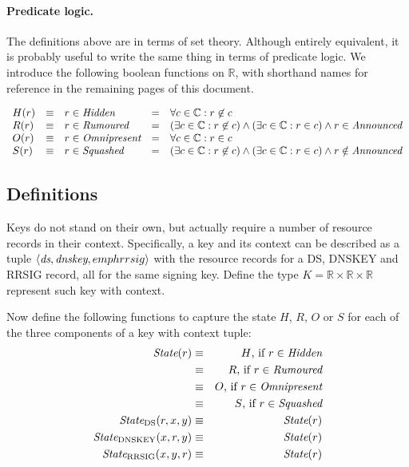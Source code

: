 \documentclass[twoside,english]{paper}
\begin{document}
\paragraph{Predicate logic.}
The definitions above are in terms of set theory.  Although entirely equivalent, it is
probably useful to write the same thing in terms of predicate logic.  We introduce the
following boolean functions on $\mathbb{R}$, with shorthand names for reference in the
remaining pages of this document.

\begin{displaymath}
\begin{array}{lllll}
       H(r) & \equiv & r\in\emph{Hidden} &=& \forall c \in \mathbb{C}: r \not \in c \\
       R(r) & \equiv & r\in\emph{Rumoured} &=& (\exists c \in \mathbb{C}: r \not \in c) \wedge (\exists c \in \mathbb{C}: r\in c) \wedge r\in\emph{Announced}\\
       O(r) & \equiv & r\in\emph{Omnipresent} &=& \forall c \in \mathbb{C}: r \in c \\
       S(r) & \equiv & r\in\emph{Squashed} &=& (\exists c \in \mathbb{C}: r \not \in c) \wedge (\exists c \in \mathbb{C}: r \in c)\wedge r\notin\emph{Announced} \\
\end{array}
\end{displaymath}



\subsection{Definitions}

Keys do not stand on their own, but actually require a number of resource records in
their context.  Specifically, a key and its context can be described as a tuple
$\langle\emph{ds},\emph{dnskey},emph{rrsig}\rangle$ with the resource records for
a DS, DNSKEY and RRSIG record, all for the same signing key.  Define the type
$K=\mathbb{R}\times\mathbb{R}\times\mathbb{R}$ represent such key with context.

\newcommand{\state}{\emph{State}}
\newcommand{\stateDS}{\emph{State}_\textrm{DS}}
\newcommand{\stateDNSKEY}{\emph{State}_\textrm{DNSKEY}}
\newcommand{\stateRRSIG}{\emph{State}_\textrm{RRSIG}}

Now define the following functions to capture the state $H$, $R$, $O$ or 
$S$
for each of the three components of a key with context tuple:
\begin{eqnarray*}
	\state(r) &\equiv& H\textrm{, if $r\in\emph{Hidden}$}\\
	          &\equiv& R\textrm{, if $r\in\emph{Rumoured}$}\\
	          &\equiv& O\textrm{, if $r\in\emph{Omnipresent}$}\\
	          &\equiv& S\textrm{, if $r\in\emph{Squashed}$}\\
	\stateDS(r,x,y) &\equiv& \state(r)\\
	\stateDNSKEY(x,r,y) &\equiv& \state(r)\\
	\stateRRSIG(x,y,r) &\equiv& \state(r)
\end{eqnarray*}
\end{document}
